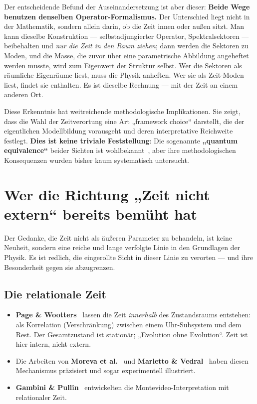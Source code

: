 \documentclass[11pt,a4paper]{article}
\begin{document}
Der entscheidende Befund der Auseinandersetzung ist aber dieser: \textbf{Beide Wege benutzen denselben Operator-Formalismus.} Der Unterschied liegt nicht in der Mathematik, sondern allein darin, ob die Zeit innen oder außen sitzt. Man kann dieselbe Konstruktion --- selbstadjungierter Operator, Spektralsektoren --- beibehalten und \emph{nur die Zeit in den Raum ziehen}; dann werden die Sektoren zu Moden, und die Masse, die zuvor über eine parametrische Abbildung angeheftet werden musste, wird zum Eigenwert der Struktur selbst. Wer die Sektoren als räumliche Eigenräume liest, muss die Physik anheften. Wer sie als Zeit-Moden liest, findet sie enthalten. Es ist dieselbe Rechnung --- mit der Zeit an einem anderen Ort.

Diese Erkenntnis hat weitreichende methodologische Implikationen. Sie zeigt, dass die Wahl der Zeitverortung eine Art „framework choice`` darstellt, die der eigentlichen Modellbildung vorausgeht und deren interpretative Reichweite festlegt. \textbf{Dies ist keine triviale Feststellung}: Die sogenannte \textbf{„quantum equivalence``} beider Sichten ist wohlbekannt~\cite{Unruh1995}, aber ihre methodologischen Konsequenzen wurden bisher kaum systematisch untersucht.

\section{Wer die Richtung „Zeit nicht extern`` bereits bemüht hat}

Der Gedanke, die Zeit nicht als äußeren Parameter zu behandeln, ist keine Neuheit, sondern eine reiche und lange verfolgte Linie in den Grundlagen der Physik. Es ist redlich, die eingerollte Sicht in dieser Linie zu verorten --- und ihre Besonderheit gegen sie abzugrenzen.

\subsection{Die relationale Zeit}
\begin{itemize}[leftmargin=1.4em,itemsep=0.25em]
  \item \textbf{Page \& Wootters}~\cite{PageWootters1983} lassen die Zeit \emph{innerhalb} des Zustandsraums entstehen: als Korrelation (Verschränkung) zwischen einem Uhr-Subsystem und dem Rest. Der Gesamtzustand ist stationär; „Evolution ohne Evolution``. Zeit ist hier intern, nicht extern.
  \item Die Arbeiten von \textbf{Moreva et al.}~\cite{Moreva2014} und \textbf{Marletto \& Vedral}~\cite{MarlettoVedral2017} haben diesen Mechanismus präzisiert und sogar experimentell illustriert.
  \item \textbf{Gambini \& Pullin}~\cite{GambiniPullin2015} entwickelten die Montevideo-Interpretation mit relationaler Zeit.
\end{itemize}
\end{document}
